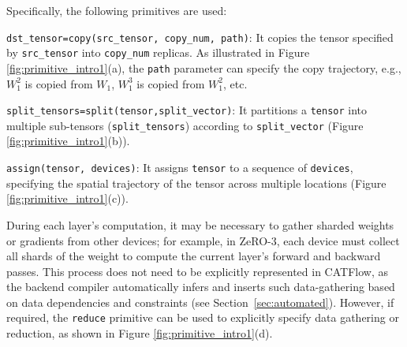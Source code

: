 \documentclass[letterpaper,twocolumn,10pt]{article}
\newcommand{\name}{CATFlow}
\begin{document}

Specifically, the following primitives are used:

\texttt{dst\_tensor=copy(src\_tensor, copy\_num, path)}: It copies the tensor specified by \texttt{src\_tensor} into \texttt{copy\_num} replicas. As illustrated in Figure \ref{fig:primitive_intro1}(a), the \texttt{path} parameter can specify the copy trajectory, e.g., $W_1^2$ is copied from $W_1$, $W_1^3$ is copied from $W_1^2$, etc.

\texttt{split\_tensors=split(tensor,split\_vector)}: It partitions a \texttt{tensor} into multiple sub-tensors (\texttt{split\_tensors}) according to \texttt{split\_vector} (Figure \ref{fig:primitive_intro1}(b)).

\texttt{assign(tensor, devices)}: It assigns \texttt{tensor} to a sequence of \texttt{devices}, specifying the spatial trajectory of the tensor across multiple locations (Figure \ref{fig:primitive_intro1}(c)).

During each layer's computation, it may be necessary to gather sharded weights or gradients from other devices; for example, in ZeRO-3, each device must collect all shards of the weight to compute the current layer's forward and backward passes. This process does not need to be explicitly represented in \name{}, as the backend compiler automatically infers and inserts such data-gathering based on data dependencies and constraints (see Section~\ref{sec:automated}). However, if required, the \texttt{reduce} primitive can be used to explicitly specify data gathering or reduction, as shown in Figure \ref{fig:primitive_intro1}(d).
\end{document}
